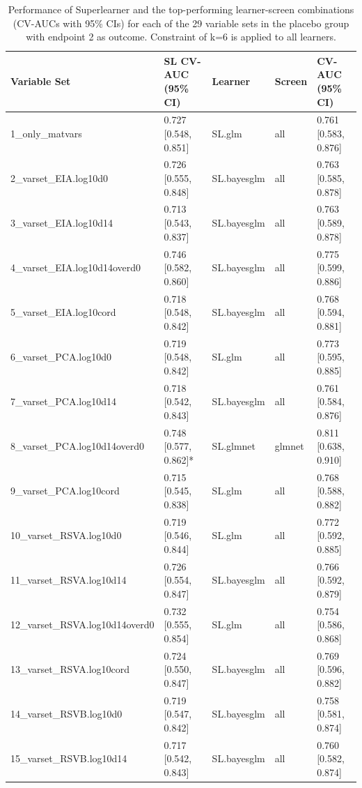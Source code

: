 \documentclass[11pt]{article}
\begin{document}
\begin{table}[!h]

\caption{\label{tab:SLperformance-plac-y2}Performance of Superlearner and the top-performing learner-screen combinations (CV-AUCs with 95\% CIs) for each of the 29 variable sets in the placebo group with endpoint 2 as outcome. Constraint of k=6 is applied to all learners.}
\centering
\fontsize{8}{10}\selectfont
\begin{threeparttable}
\begin{tabular}[t]{lllll}
\toprule
Variable Set & SL CV-AUC (95\% CI) & Learner & Screen & CV-AUC (95\% CI)\\
\midrule
1\_only\_matvars & 0.727 [0.548, 0.851] & SL.glm & all & 0.761 [0.583, 0.876]\\
2\_varset\_EIA.log10d0 & 0.726 [0.555, 0.848] & SL.bayesglm & all & 0.763 [0.585, 0.878]\\
3\_varset\_EIA.log10d14 & 0.713 [0.543, 0.837] & SL.bayesglm & all & 0.763 [0.589, 0.878]\\
4\_varset\_EIA.log10d14overd0 & 0.746 [0.582, 0.860] & SL.bayesglm & all & 0.775 [0.599, 0.886]\\
5\_varset\_EIA.log10cord & 0.718 [0.548, 0.842] & SL.bayesglm & all & 0.768 [0.594, 0.881]\\
6\_varset\_PCA.log10d0 & 0.719 [0.548, 0.842] & SL.glm & all & 0.773 [0.595, 0.885]\\
7\_varset\_PCA.log10d14 & 0.718 [0.542, 0.843] & SL.bayesglm & all & 0.761 [0.584, 0.876]\\
8\_varset\_PCA.log10d14overd0 & 0.748 [0.577, 0.862]* & SL.glmnet & glmnet & 0.811 [0.638, 0.910]\\
9\_varset\_PCA.log10cord & 0.715 [0.545, 0.838] & SL.glm & all & 0.768 [0.588, 0.882]\\
10\_varset\_RSVA.log10d0 & 0.719 [0.546, 0.844] & SL.glm & all & 0.772 [0.592, 0.885]\\
11\_varset\_RSVA.log10d14 & 0.726 [0.554, 0.847] & SL.bayesglm & all & 0.766 [0.592, 0.879]\\
12\_varset\_RSVA.log10d14overd0 & 0.732 [0.555, 0.854] & SL.glm & all & 0.754 [0.586, 0.868]\\
13\_varset\_RSVA.log10cord & 0.724 [0.550, 0.847] & SL.bayesglm & all & 0.769 [0.596, 0.882]\\
14\_varset\_RSVB.log10d0 & 0.719 [0.547, 0.842] & SL.bayesglm & all & 0.758 [0.581, 0.874]\\
15\_varset\_RSVB.log10d14 & 0.717 [0.542, 0.843] & SL.bayesglm & all & 0.760 [0.582, 0.874]\\

\end{tabular}
\end{threeparttable}
\end{table}
\end{document}
